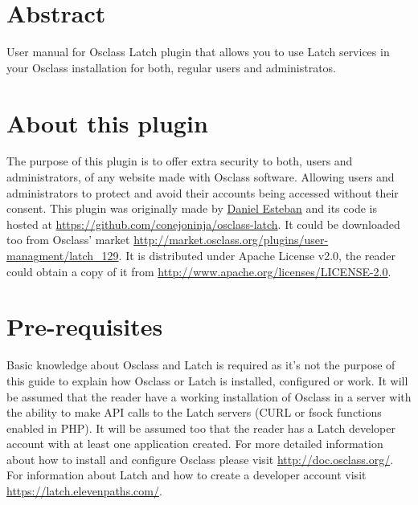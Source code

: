 \documentclass[
10pt,
a4paper,
oneside,
headinclude,footinclude,
BCOR5mm,
]{scrartcl}
\title{\normalfont\spacedallcaps{Osclass Latch Plugin User Manual}}
\author{\spacedlowsmallcaps{Daniel Esteban}}
\begin{document}
\renewcommand{\sectionmark}[1]{\markright{\spacedlowsmallcaps{#1}}}
\lehead{\mbox{\llap{\small\thepage\kern1em\color{halfgray} \vline}\color{halfgray}\hspace{0.5em}\rightmark\hfil}}

\pagestyle{scrheadings} 

\maketitle
\setcounter{tocdepth}{2}
\tableofcontents
\listoffigures

\section*{Abstract}
User manual for Osclass Latch plugin that allows you to use Latch services in your Osclass installation for both, regular users and administratos.


\newpage 

\section{About this plugin}
The purpose of this plugin is to offer extra security to both, users and administrators, of any website made with Osclass software. Allowing users and administrators to protect and avoid their accounts being accessed without their consent. This plugin was originally made by \href{https://github.com/conejoninja}{Daniel Esteban} and its code is hosted at \href{https://github.com/conejoninja/osclass-latch}{https://github.com/conejoninja/osclass-latch}. It could be downloaded too from Osclass' market \href{http://market.osclass.org/plugins/user-managment/latch\_129}{http://market.osclass.org/plugins/user-managment/latch\_129}. It is distributed under Apache License v2.0, the reader could obtain a copy of it from \href{http://www.apache.org/licenses/LICENSE-2.0}{http://www.apache.org/licenses/LICENSE-2.0}.


\section{Pre-requisites}
Basic knowledge about Osclass and Latch is required as it's not the purpose of this guide to explain how Osclass or Latch is installed, configured or work. It will be assumed that the reader have a working installation of Osclass in a server with the ability to make API calls to the Latch servers (CURL or fsock functions enabled in PHP). It will be assumed too that the reader has a Latch developer account with at least one application created. For more detailed information about how to install and configure Osclass please visit \href{http://doc.osclass.org/}{http://doc.osclass.org/}. For information about Latch and how to create a developer account visit \href{https://latch.elevenpaths.com/}{https://latch.elevenpaths.com/}.
\end{document}
